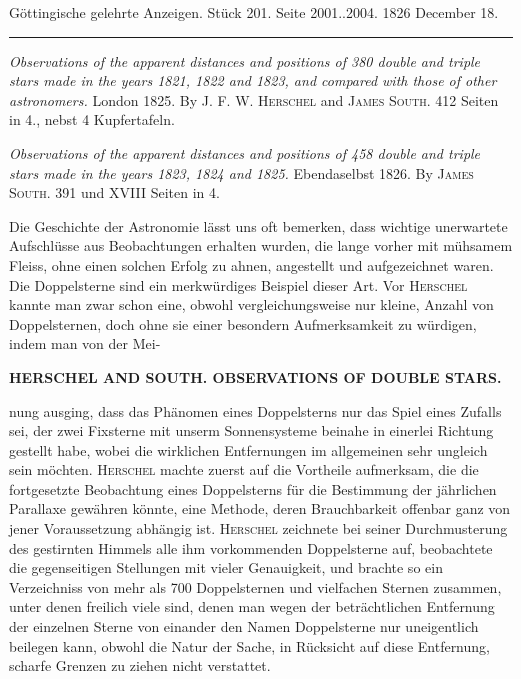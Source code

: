 \par\bigskip
{}
\hypertarget{native-647-lower}{}
\begin{center}\small Göttingische gelehrte Anzeigen. Stück 201. Seite 2001..2004. 1826 December 18.\\[3pt]\rule{.72\linewidth}{.3pt}\end{center}

\emph{Observations of the apparent distances and positions of \textup{380} double and triple stars made in the years \textup{1821}, \textup{1822} and \textup{1823}, and compared with those of other astronomers.} London 1825. By \textsc{J. F. W. Herschel} and \textsc{James South}. 412 Seiten in 4., nebst 4 Kupfertafeln.

\emph{Observations of the apparent distances and positions of \textup{458} double and triple stars made in the years \textup{1823}, \textup{1824} and \textup{1825}.} Ebendaselbst 1826. By \textsc{James South}. 391 und XVIII Seiten in 4.

Die Geschichte der Astronomie lässt uns oft bemerken, dass wichtige unerwartete Aufschlüsse aus Beobachtungen erhalten wurden, die lange vorher mit mühsamem Fleiss, ohne einen solchen Erfolg zu ahnen, angestellt und aufgezeichnet waren. Die Doppelsterne sind ein merkwürdiges Beispiel dieser Art. Vor \textsc{Herschel} kannte man zwar schon eine, obwohl vergleichungsweise nur kleine, Anzahl von Doppelsternen, doch ohne sie einer besondern Aufmerksamkeit zu würdigen, indem man von der Mei-
\par\clearpage\thispagestyle{empty}
\fancyhead[L]{}
\noindent\makebox[12mm][l]{\large\bfseries }\parbox[t]{\dimexpr\linewidth-24mm\relax}{\centering\scriptsize\bfseries HERSCHEL AND SOUTH. OBSERVATIONS OF DOUBLE STARS.}\par\nobreak\medskip\noindent nung ausging, dass das Phänomen eines Doppelsterns nur das Spiel eines Zufalls sei, der zwei Fixsterne mit unserm Sonnensysteme beinahe in einerlei Richtung gestellt habe, wobei die wirklichen Entfernungen im allgemeinen sehr ungleich sein möchten. \textsc{Herschel} machte zuerst auf die Vortheile aufmerksam, die die fortgesetzte Beobachtung eines Doppelsterns für die Bestimmung der jährlichen Parallaxe gewähren könnte, eine Methode, deren Brauchbarkeit offenbar ganz von jener Voraussetzung abhängig ist. \textsc{Herschel} zeichnete bei seiner Durchmusterung des gestirnten Himmels alle ihm vorkommenden Doppelsterne auf, beobachtete die gegenseitigen Stellungen mit vieler Genauigkeit, und brachte so ein Verzeichniss von mehr als 700 Doppelsternen und vielfachen Sternen zusammen, unter denen freilich viele sind, denen man wegen der beträchtlichen Entfernung der einzelnen Sterne von einander den Namen Doppelsterne nur uneigentlich beilegen kann, obwohl die Natur der Sache, in Rücksicht auf diese Entfernung, scharfe Grenzen zu ziehen nicht verstattet.

